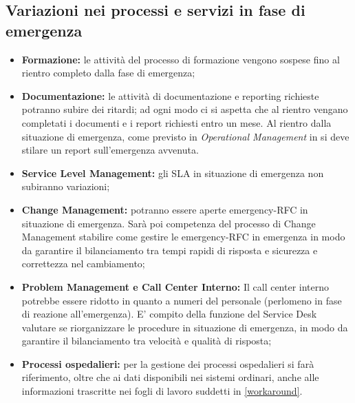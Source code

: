 \subsection{Variazioni nei processi e servizi in fase di emergenza}
\begin{itemize}
\item \textbf{Formazione:} le attività del processo  di formazione vengono sospese fino al rientro completo dalla fase di emergenza;
\item \textbf{Documentazione:} le attività di documentazione e reporting richieste potranno subire dei ritardi; ad ogni modo ci si aspetta che al rientro vengano completati i documenti e i report richiesti entro un mese. Al rientro dalla situazione di emergenza, come previsto in \textit{Operational Management} in \pageref{rientro} si deve stilare un report sull'emergenza avvenuta.
\item \textbf{Service Level Management:} gli SLA in situazione di emergenza non subiranno variazioni;
\item \textbf{Change Management:} potranno essere aperte emergency-RFC in situazione di emergenza. Sarà poi competenza del processo di Change Management stabilire come gestire le emergency-RFC in emergenza in modo da garantire il bilanciamento tra tempi rapidi di risposta e sicurezza e correttezza nel cambiamento;
\item \textbf{Problem Management e Call Center Interno:} Il call center interno potrebbe essere ridotto in quanto a numeri del personale (perlomeno in fase di reazione all'emergenza). E' compito della funzione del Service Desk valutare se riorganizzare le procedure in situazione di emergenza, in modo da garantire il bilanciamento tra velocità e qualità di risposta;
\item \textbf{Processi ospedalieri: } per la gestione dei processi ospedalieri si farà riferimento, oltre che ai dati disponibili nei sistemi ordinari, anche alle informazioni trascritte nei fogli di lavoro suddetti in \ref{workaround}.
\end{itemize}


















































